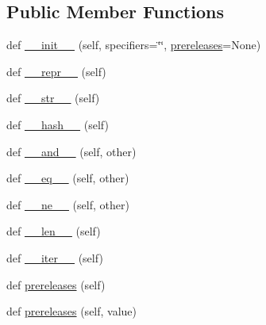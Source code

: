 \subsection*{Public Member Functions}
\begin{DoxyCompactItemize}
\item 
def \hyperlink{classpkg__resources_1_1__vendor_1_1packaging_1_1specifiers_1_1SpecifierSet_ae59b28230a31d73061d4e965fada4f17}{\+\_\+\+\_\+init\+\_\+\+\_\+} (self, specifiers=\char`\"{}\char`\"{}, \hyperlink{classpkg__resources_1_1__vendor_1_1packaging_1_1specifiers_1_1SpecifierSet_a8d40983e7e62eac0fba7c36aec5da9ba}{prereleases}=None)
\item 
def \hyperlink{classpkg__resources_1_1__vendor_1_1packaging_1_1specifiers_1_1SpecifierSet_abe097df2582585ded1237da4e59def9b}{\+\_\+\+\_\+repr\+\_\+\+\_\+} (self)
\item 
def \hyperlink{classpkg__resources_1_1__vendor_1_1packaging_1_1specifiers_1_1SpecifierSet_ae6db7b13ca5c3414579a0aae535874f0}{\+\_\+\+\_\+str\+\_\+\+\_\+} (self)
\item 
def \hyperlink{classpkg__resources_1_1__vendor_1_1packaging_1_1specifiers_1_1SpecifierSet_a203380ac112decd8a0406ed7e0542578}{\+\_\+\+\_\+hash\+\_\+\+\_\+} (self)
\item 
def \hyperlink{classpkg__resources_1_1__vendor_1_1packaging_1_1specifiers_1_1SpecifierSet_a6d289b1329b7a0dbe77469ad54e1e1bf}{\+\_\+\+\_\+and\+\_\+\+\_\+} (self, other)
\item 
def \hyperlink{classpkg__resources_1_1__vendor_1_1packaging_1_1specifiers_1_1SpecifierSet_a323f716d11d99d3098251ce891caaf7f}{\+\_\+\+\_\+eq\+\_\+\+\_\+} (self, other)
\item 
def \hyperlink{classpkg__resources_1_1__vendor_1_1packaging_1_1specifiers_1_1SpecifierSet_affe105c755d664843a6daaa770381cf4}{\+\_\+\+\_\+ne\+\_\+\+\_\+} (self, other)
\item 
def \hyperlink{classpkg__resources_1_1__vendor_1_1packaging_1_1specifiers_1_1SpecifierSet_af092378544da6b2bb6b00b07a767496d}{\+\_\+\+\_\+len\+\_\+\+\_\+} (self)
\item 
def \hyperlink{classpkg__resources_1_1__vendor_1_1packaging_1_1specifiers_1_1SpecifierSet_ae3e1d56ec20225f106bbbb7d4f3ad727}{\+\_\+\+\_\+iter\+\_\+\+\_\+} (self)
\item 
def \hyperlink{classpkg__resources_1_1__vendor_1_1packaging_1_1specifiers_1_1SpecifierSet_a8d40983e7e62eac0fba7c36aec5da9ba}{prereleases} (self)
\item 
def \hyperlink{classpkg__resources_1_1__vendor_1_1packaging_1_1specifiers_1_1SpecifierSet_ad5f2f43dca1a27acc540f760d112d30f}{prereleases} (self, value)

\end{DoxyCompactItemize}
